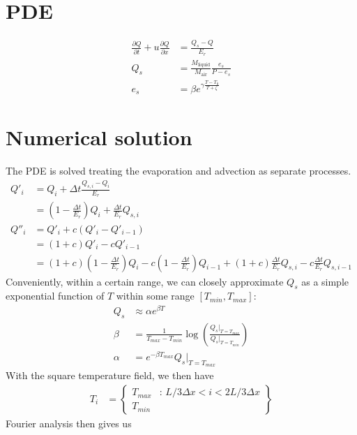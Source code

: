 \documentclass[12pt]{article}
\begin{document}
\section{PDE}
\begin{align*}
\frac{\partial Q}{\partial t}+u\frac{\partial Q}{\partial x} &= \frac{Q_s - Q}{E_r}	\tag{modified B\&F PDE} \\
Q_s &= \frac{M_\text{liquid}}{M_\text{air}}\frac{e_s}{P-e_s}				\tag{magic air equation} \\
e_s &= \beta e^{\gamma\frac{T-T_0}{T+\zeta}}						\tag{Tetens formula}
\end{align*}

\section{Numerical solution}
The PDE is solved treating the evaporation and advection as separate processes.
\begin{align*}
Q'_i &= Q_i + \Delta t\frac{Q_{s,i} - Q_i}{E_r} \\
&= \left(1-\frac{\Delta t}{E_r}\right)Q_i + \frac{\Delta t}{E_r}Q_{s,i} \\
Q''_i &= Q'_i + c\left(Q'_i - Q'_{i-1}\right) \\
&= \left(1+c\right)Q'_i -cQ'_{i-1} \\
&= \left(1+c\right)\left(1-\frac{\Delta t}{E_r}\right)Q_i - c\left(1-\frac{\Delta t}{E_r}\right)Q_{i-1}
	+ \left(1+c\right)\frac{\Delta t}{E_r}Q_{s,i} - c\frac{\Delta t}{E_r}Q_{s,i-1}
\end{align*}
Conveniently, within a certain range, we can closely approximate $Q_s$ as a simple exponential function of $T$ within some range $\left[T_{min},T_{max}\right]$:
\begin{align*}
Q_s &\approx \alpha e^{\beta T} \\
\beta &= \frac{1}{T_{max}-T_{min}}\log\left(\frac{Q_s|_{T=T_{max}}}{Q_s|_{T=T_{min}}}\right) \\
\alpha &= e^{-\beta T_{max}}Q_s|_{T=T_{max}}
\end{align*}
With the square temperature field, we then have
\begin{align*}
T_i &= \left.\begin{cases}
	T_{max} & \text{: } L/3\Delta x<i<2L/3\Delta x \\
	T_{min} & \text{~}
\end{cases}\right\}
\end{align*}
Fourier analysis then gives us
\end{document}
